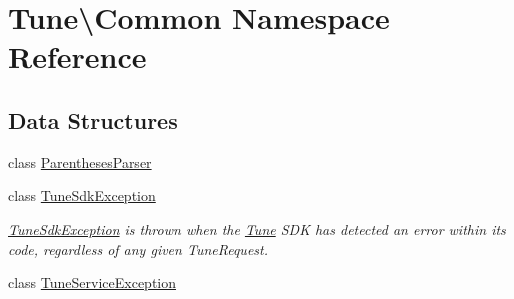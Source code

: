 \hypertarget{namespaceTune_1_1Common}{\section{Tune\textbackslash{}Common Namespace Reference}
\label{namespaceTune_1_1Common}
}
\subsection*{Data Structures}
\begin{DoxyCompactItemize}
\item 
class \hyperlink{classTune_1_1Common_1_1ParenthesesParser}{Parentheses\-Parser}
\item 
class \hyperlink{classTune_1_1Common_1_1TuneSdkException}{Tune\-Sdk\-Exception}
\begin{DoxyCompactList}\small\item\em \hyperlink{classTune_1_1Common_1_1TuneSdkException}{Tune\-Sdk\-Exception} is thrown when the \hyperlink{namespaceTune}{Tune} S\-D\-K has detected an error within its code, regardless of any given Tune\-Request. \end{DoxyCompactList}\item 
class \hyperlink{classTune_1_1Common_1_1TuneServiceException}{Tune\-Service\-Exception}
\end{DoxyCompactItemize}
